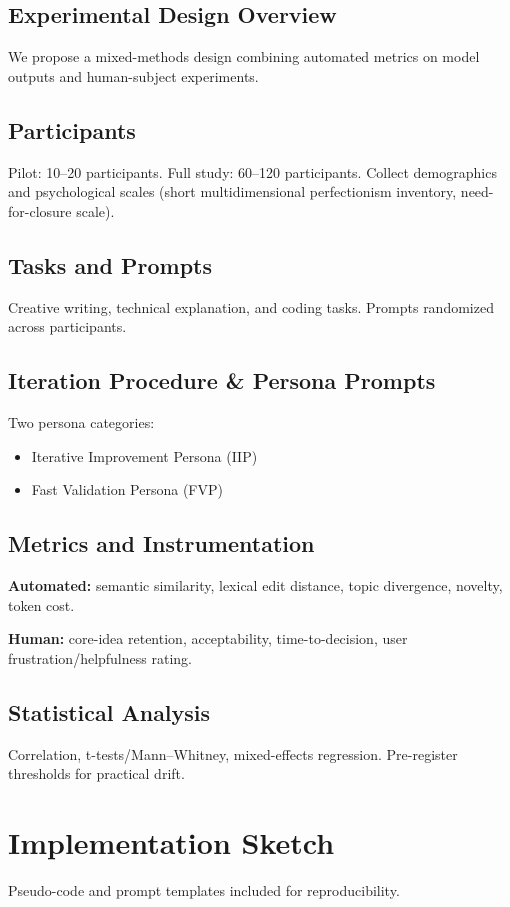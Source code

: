 \documentclass[conference]{IEEEtran} %
\begin{document}
\subsection{Experimental Design Overview}
We propose a mixed-methods design combining automated metrics on model outputs and human-subject experiments.  

\subsection{Participants}
Pilot: 10–20 participants. Full study: 60–120 participants. Collect demographics and psychological scales (short multidimensional perfectionism inventory, need-for-closure scale).  

\subsection{Tasks and Prompts}
Creative writing, technical explanation, and coding tasks. Prompts randomized across participants.

\subsection{Iteration Procedure \& Persona Prompts}
Two persona categories:
\begin{itemize}
    \item Iterative Improvement Persona (IIP)
    \item Fast Validation Persona (FVP)
\end{itemize}

\subsection{Metrics and Instrumentation}
\textbf{Automated:} semantic similarity, lexical edit distance, topic divergence, novelty, token cost.  

\textbf{Human:} core-idea retention, acceptability, time-to-decision, user frustration/helpfulness rating.

\subsection{Statistical Analysis}
Correlation, t-tests/Mann–Whitney, mixed-effects regression. Pre-register thresholds for practical drift.

\section{Implementation Sketch}
Pseudo-code and prompt templates included for reproducibility.
\end{document}
